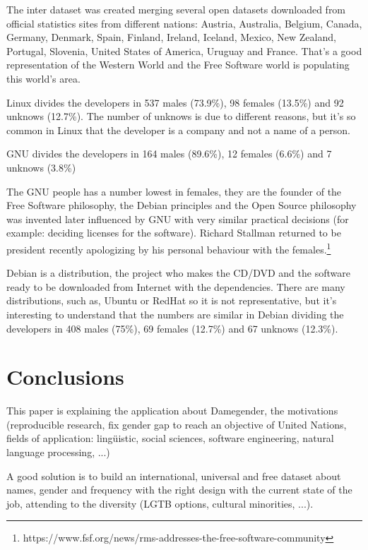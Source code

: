 \documentclass[a4paper]{article}
\begin{document}
The inter dataset was created merging several open datasets downloaded
from official statistics sites from different nations: Austria,
Australia, Belgium, Canada, Germany, Denmark, Spain, Finland, Ireland,
Iceland, Mexico, New Zealand, Portugal, Slovenia, United States of
America, Uruguay and France. That's a good representation of the
Western World and the Free Software world is populating this world's
area\cite{gonzalez2008geographic}.

Linux divides the developers in 537 males (73.9\%), 98 females
(13.5\%) and 92 unknows (12.7\%). The number of unknows is due to
different reasons, but it's so common in Linux that the developer is a
company and not a name of a person.

GNU divides the developers in 164 males (89.6\%), 12 females (6.6\%)
and 7 unknows (3.8\%)

The GNU people has a number lowest in females, they are the founder of
the Free Software philosophy, the Debian principles and the Open
Source philosophy was invented later influenced by GNU with very
similar practical decisions (for example: deciding licenses for the
software). Richard Stallman returned to be president recently
apologizing by his personal behaviour with the
females.\footnote{https://www.fsf.org/news/rms-addresses-the-free-software-community}

Debian is a distribution, the project who makes the CD/DVD and the
software ready to be downloaded from Internet with the
dependencies. There are many distributions, such as, Ubuntu or RedHat
so it is not representative, but it's interesting to understand that
the numbers are similar in Debian dividing the developers in 408 males
(75\%), 69 females (12.7\%) and 67 unknows (12.3\%).


\section{Conclusions}
\label{sec:conclusions}

This paper is explaining the application about Damegender, the
motivations (reproducible research, fix gender gap to reach an
objective of United Nations, fields of application: lingüistic, social
sciences, software engineering, natural language processing, ...)

A good solution is to build an international, universal and free
dataset about names, gender and frequency with the right design with
the current state of the job, attending to the diversity (LGTB
options, cultural minorities, ...).
\end{document}
